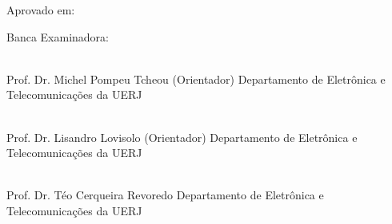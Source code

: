 \addtocounter{page}{+1}
\begin{center}

\setNomeAluno

\vspace{1cm}

\textbf{\setTitulo}

\end{center}

\vspace{.4cm}

\begin{flushright}
\parbox{8cm}{
}
\end{flushright}

\vspace{.6cm}



\noindent Aprovado em: \setApprovalDate

\noindent Banca Examinadora:


%
%
%
%



\vspace{.7cm}

\begin{flushright}
\parbox{12cm}{

\singlespacing

\hrulefill \\

\vspace{-.4cm}
Prof. Dr. Michel Pompeu Tcheou (Orientador)
\newline
Departamento de Eletrônica e Telecomunicações da UERJ
\vspace{1.1cm}

\hrulefill \\

\vspace{-.4cm}
Prof. Dr. Lisandro Lovisolo (Orientador)
\newline
Departamento de Eletrônica e Telecomunicações da UERJ
\vspace{1.1cm}


\hrulefill \\

\vspace{-.4cm}
Prof. Dr. Téo Cerqueira Revoredo
\newline
Departamento de Eletrônica e Telecomunicações da UERJ
\vspace{1.1cm}

}

\end{flushright}
\vfill
	

\begin{center}
\setLocationDate
\end{center}
